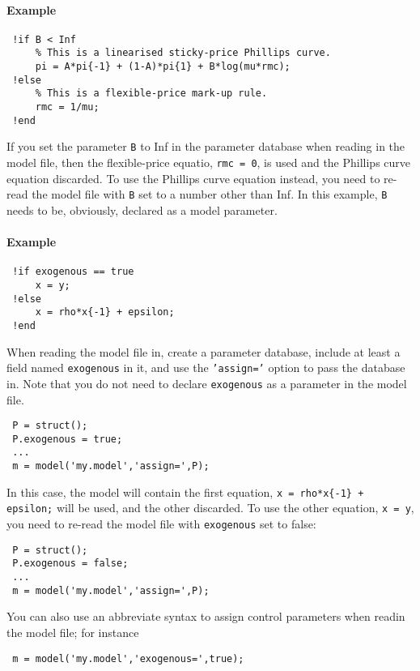  \paragraph{Example}
 
 \begin{verbatim}
 !if B < Inf
     % This is a linearised sticky-price Phillips curve.
     pi = A*pi{-1} + (1-A)*pi{1} + B*log(mu*rmc);
 !else
     % This is a flexible-price mark-up rule.
     rmc = 1/mu;
 !end
 \end{verbatim}
 
 If you set the parameter \texttt{B} to Inf in the parameter database
 when reading in the model file, then the flexible-price equatio,
 \texttt{rmc = 0}, is used and the Phillips curve equation discarded. To
 use the Phillips curve equation instead, you need to re-read the model
 file with \texttt{B} set to a number other than Inf. In this example,
 \texttt{B} needs to be, obviously, declared as a model parameter.
 
 \paragraph{Example}
 
 \begin{verbatim}
 !if exogenous == true
     x = y;
 !else
     x = rho*x{-1} + epsilon;
 !end
 \end{verbatim}
 
 When reading the model file in, create a parameter database, include at
 least a field named \texttt{exogenous} in it, and use the
 \texttt{'assign='} option to pass the database in. Note that you do not
 need to declare \texttt{exogenous} as a parameter in the model file.
 
 \begin{verbatim}
 P = struct();
 P.exogenous = true;
 ...
 m = model('my.model','assign=',P);
 \end{verbatim}
 
 In this case, the model will contain the first equation,
 \texttt{x = rho*x\{-1\} + epsilon;} will be used, and the other
 discarded. To use the other equation, \texttt{x = y}, you need to
 re-read the model file with \texttt{exogenous} set to false:
 
 \begin{verbatim}
 P = struct();
 P.exogenous = false;
 ...
 m = model('my.model','assign=',P);
 \end{verbatim}
 
 You can also use an abbreviate syntax to assign control parameters when
 readin the model file; for instance
 
 \begin{verbatim}
 m = model('my.model','exogenous=',true);
 \end{verbatim}



